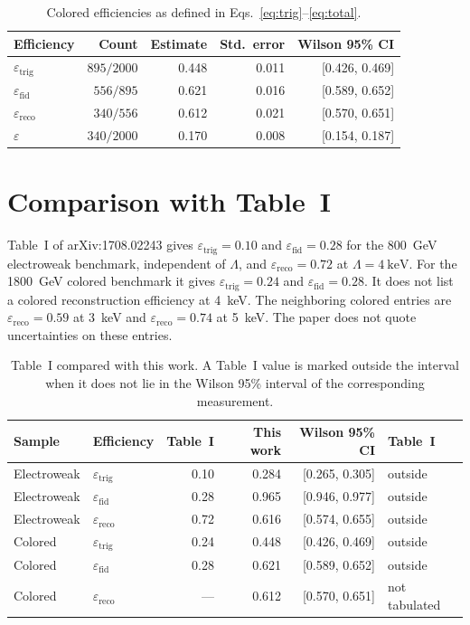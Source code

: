 \documentclass[11pt,a4paper]{article}
\begin{document}
\begin{table}[H]
\centering
\caption{Colored efficiencies as defined in Eqs.~\eqref{eq:trig}--\eqref{eq:total}.}
\label{tab:qcd-eff}
\begin{tabular}{lrrrr}
\toprule
Efficiency & Count & Estimate & Std.\ error & Wilson 95\% CI \\
\midrule
\(\varepsilon_{\mathrm{trig}}\) & \(895/2000\) & 0.448 & 0.011 & [0.426, 0.469] \\
\(\varepsilon_{\mathrm{fid}}\)  & \(556/895\)  & 0.621 & 0.016 & [0.589, 0.652] \\
\(\varepsilon_{\mathrm{reco}}\) & \(340/556\)  & 0.612 & 0.021 & [0.570, 0.651] \\
\(\varepsilon\)                 & \(340/2000\) & 0.170 & 0.008 & [0.154, 0.187] \\
\bottomrule
\end{tabular}
\end{table}

\section{Comparison with Table~I}
Table~I of arXiv:1708.02243 gives \(\varepsilon_{\mathrm{trig}} = 0.10\) and \(\varepsilon_{\mathrm{fid}} = 0.28\) for the \SI{800}{\GeV} electroweak benchmark, independent of \(\Lambda\), and \(\varepsilon_{\mathrm{reco}} = 0.72\) at \(\Lambda = \SI{4}{\keV}\).
For the \SI{1800}{\GeV} colored benchmark it gives \(\varepsilon_{\mathrm{trig}} = 0.24\) and \(\varepsilon_{\mathrm{fid}} = 0.28\).
It does not list a colored reconstruction efficiency at \SI{4}{\keV}.
The neighboring colored entries are \(\varepsilon_{\mathrm{reco}} = 0.59\) at \SI{3}{\keV} and \(\varepsilon_{\mathrm{reco}} = 0.74\) at \SI{5}{\keV}.
The paper does not quote uncertainties on these entries.

\begin{table}[H]
\centering
\caption{Table~I compared with this work. A Table~I value is marked outside the interval when it does not lie in the Wilson 95\% interval of the corresponding measurement.}
\label{tab:compare}
\small
\begin{tabular}{llrrrl}
\toprule
Sample & Efficiency & Table~I & This work & Wilson 95\% CI & Table~I \\
\midrule
Electroweak & \(\varepsilon_{\mathrm{trig}}\) & 0.10 & 0.284 & [0.265, 0.305] & outside \\
Electroweak & \(\varepsilon_{\mathrm{fid}}\)  & 0.28 & 0.965 & [0.946, 0.977] & outside \\
Electroweak & \(\varepsilon_{\mathrm{reco}}\) & 0.72 & 0.616 & [0.574, 0.655] & outside \\
Colored     & \(\varepsilon_{\mathrm{trig}}\) & 0.24 & 0.448 & [0.426, 0.469] & outside \\
Colored     & \(\varepsilon_{\mathrm{fid}}\)  & 0.28 & 0.621 & [0.589, 0.652] & outside \\
Colored     & \(\varepsilon_{\mathrm{reco}}\) & ---  & 0.612 & [0.570, 0.651] & not tabulated \\
\bottomrule
\end{tabular}
\end{table}
\end{document}
